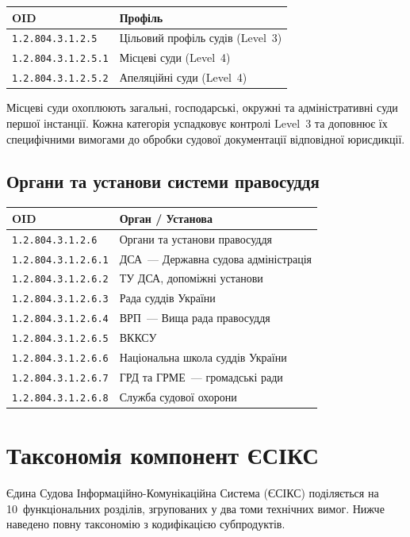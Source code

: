 \begin{tabular}{ll}
\textbf{OID}                 & \textbf{Профіль} \\
\hline
\texttt{1.2.804.3.1.2.5}     & Цільовий профіль судів (Level~3) \\
\texttt{1.2.804.3.1.2.5.1}   & Місцеві суди (Level~4) \\
\texttt{1.2.804.3.1.2.5.2}   & Апеляційні суди (Level~4) \\
\end{tabular}

\vspace{0.5em}
Місцеві суди охоплюють загальні, господарські, окружні та адміністративні суди
першої інстанції. Кожна категорія успадковує контролі Level~3 та доповнює їх
специфічними вимогами до обробки судової документації відповідної юрисдикції.

\subsection{Органи та установи системи правосуддя}

\begin{tabular}{ll}
\textbf{OID}                 & \textbf{Орган / Установа} \\
\hline
\texttt{1.2.804.3.1.2.6}     & Органи та установи правосуддя \\
\texttt{1.2.804.3.1.2.6.1}   & ДСА~--- Державна судова адміністрація \\
\texttt{1.2.804.3.1.2.6.2}   & ТУ ДСА, допоміжні установи \\
\texttt{1.2.804.3.1.2.6.3}   & Рада суддів України \\
\texttt{1.2.804.3.1.2.6.4}   & ВРП~--- Вища рада правосуддя \\
\texttt{1.2.804.3.1.2.6.5}   & ВККСУ \\
\texttt{1.2.804.3.1.2.6.6}   & Національна школа суддів України \\
\texttt{1.2.804.3.1.2.6.7}   & ГРД та ГРМЕ~--- громадські ради \\
\texttt{1.2.804.3.1.2.6.8}   & Служба судової охорони \\
\end{tabular}

\newpage
\section{Таксономія компонент ЄСІКС}

Єдина Судова Інформаційно-Комунікаційна Система (ЄСІКС) поділяється на 10~функціональних
розділів, згрупованих у два томи технічних вимог. Нижче наведено повну таксономію з
кодифікацією субпродуктів.

